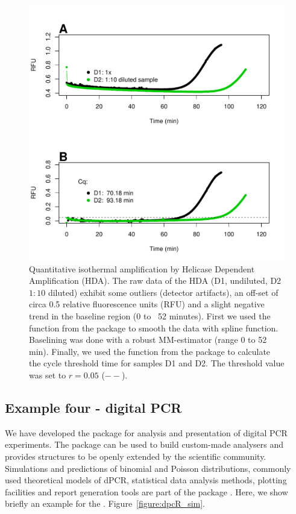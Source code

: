 \begin{figure}[htbp]
  \centering
  \includegraphics[clip=true, width=16cm]{figures/qIA.pdf}
  \caption{Quantitative isothermal amplification by Helicase Dependent 
Amplification (HDA).  The raw data of the HDA (D1, undiluted, D2 
$1:10$ diluted) exhibit some outliers (detector artifacts), an off-set of circa 
0.5 relative fluorescence units (RFU) and a slight negative trend in the 
baseline region (0 to ~52 minutes).  First we used the  
function from the  package to smooth the data with spline 
function. Baselining was done with a robust MM-estimator (range 0 to 52 min). 
Finally, we used the  function from the  package 
to calculate the cycle threshold time for samples D1 and D2. The threshold value 
was set to $r = 0.05$ ($--$).}
  \label{figure:qIA}
\end{figure}

\subsection{Example four - digital PCR}

We have developed the  package for analysis and presentation of 
digital PCR experiments. The  package can be used to build 
custom-made analysers and provides structures to be openly extended by the 
scientific community. Simulations and predictions of binomial and Poisson 
distributions, commonly used theoretical models of dPCR, statistical data 
analysis methods, plotting facilities and report generation tools are part of 
the package \citep{pabinger_2014}. Here, we show briefly an example for the 
. Figure~\ref{figure:dpcR_sim}.

